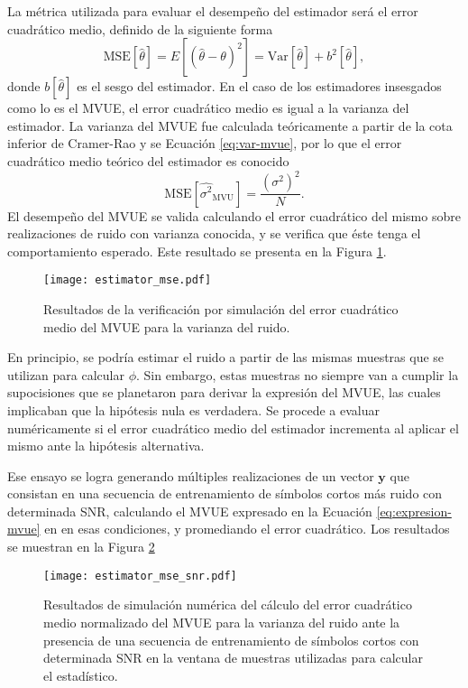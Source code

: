 La métrica utilizada para evaluar el desempeño del estimador será el error cuadrático medio, definido de la siguiente forma
\begin{equation}
    \text{MSE}[\widehat{\theta}] = E\left[(\widehat{\theta}-\theta)^2\right] = \text{Var}[\widehat{\theta}] + b^2[\widehat{\theta}],
\end{equation}
donde $b[\widehat{\theta}]$ es el sesgo del estimador. En el caso de los estimadores insesgados como lo es el MVUE, el error cuadrático medio es igual a la varianza del estimador. La varianza del MVUE fue calculada teóricamente a partir de la cota inferior de Cramer-Rao y se Ecuación \ref{eq:var-mvue}, por lo que el error cuadrático medio teórico del estimador es conocido
\begin{equation}\label{eq:mvue-mse}
    \text{MSE}[\widehat{\sigma^2}_{\text{MVU}}] = \frac{\left(\sigma^2\right)^2}{N}.
\end{equation}
El desempeño del MVUE se valida calculando el error cuadrático del mismo sobre realizaciones de ruido con varianza conocida, y se verifica que éste tenga el comportamiento esperado. Este resultado se presenta en la Figura \ref{fig:estimator_mse}.
\begin{figure}[t]
    \centering{}\texttt{[image: estimator\_mse.pdf]}
    \caption{Resultados de la verificación por simulación del error cuadrático medio del MVUE para la varianza del ruido.\label{fig:estimator_mse}}
\end{figure}

En principio, se podría estimar el ruido a partir de las mismas muestras que se utilizan para calcular $\phi$. Sin embargo, estas muestras no siempre van a cumplir la supocisiones que se planetaron para derivar la expresión del MVUE, las cuales implicaban que la hipótesis nula es verdadera. Se procede a evaluar numéricamente si el error cuadrático medio del estimador incrementa al aplicar el mismo ante la hipótesis alternativa. 

Ese ensayo se logra generando múltiples realizaciones de un vector $\mathbf{y}$ que consistan en una secuencia de entrenamiento de símbolos cortos más ruido con determinada SNR, calculando el MVUE expresado en la Ecuación \ref{eq:expresion-mvue} en en esas condiciones, y promediando el error cuadrático. Los resultados se muestran en la Figura \ref{fig:estimator_mse_snr} 
\begin{figure}[t]
    \centering{}\texttt{[image: estimator\_mse\_snr.pdf]}
    \caption{Resultados de simulación numérica del cálculo del error cuadrático medio normalizado del MVUE para la varianza del ruido ante la presencia de una secuencia de entrenamiento de símbolos cortos con determinada SNR en la ventana de muestras utilizadas para calcular el estadístico.\label{fig:estimator_mse_snr}}
\end{figure}

